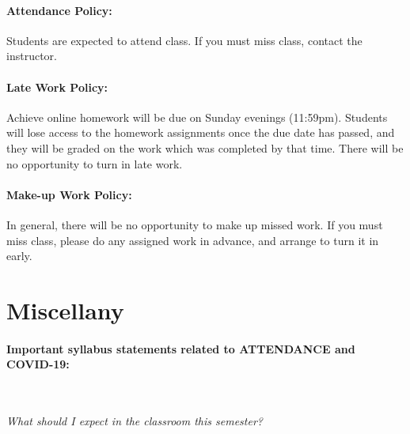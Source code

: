\documentclass[12pt, letterpaper]{article}
\begin{document}
\paragraph{Attendance Policy:}
Students are expected to attend class. If you must miss class, contact the instructor.

\paragraph{Late Work Policy:}
Achieve online homework will be due on Sunday evenings (11:59pm). Students will lose access to the homework assignments once the due date has passed, and they will be graded on the work which was completed by that time. There will be no opportunity to turn in late work.

\paragraph{Make-up Work Policy:}
In general, there will be no opportunity to make up missed work. If you must miss class, please do any assigned work in advance, and arrange to turn it in early.

\section*{Miscellany}

\paragraph{Important syllabus statements related to ATTENDANCE and COVID-19:} ~

\noindent\emph{What should I expect in the classroom this semester?}
\end{document}
